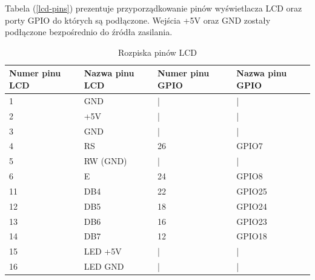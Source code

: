 \documentclass[11pt,a4paper, twoside]{article}
\begin{document}
Tabela (\ref{lcd-pins}) prezentuje przyporządkowanie pinów wyświetlacza LCD oraz porty GPIO do których są podłączone. Wejścia +5V oraz GND zostały podłączone bezpośrednio do źródła zasilania.
\begin{table}[H]
\begin{center}
\begin{tabular}{ | l | l | l | l | }
\hline
Numer pinu LCD & Nazwa pinu LCD & Numer pinu GPIO & Nazwa pinu GPIO \\ \hline
1 & GND & | &  | \\ \hline
2 & +5V & | &  | \\ \hline
3 & GND & | &  | \\ \hline
4 & RS &  26 & GPIO7 \\ \hline
5 & RW (GND) & | & | \\ \hline 
6 & E & 24 & GPIO8 \\ \hline
11 & DB4 & 22 & GPIO25 \\ \hline
12 & DB5 & 18 & GPIO24 \\ \hline
13 & DB6 & 16 & GPIO23 \\ \hline
14 & DB7 & 12 & GPIO18 \\ \hline
15 & LED +5V & | & | \\ \hline
16 & LED GND & | & | \\ \hline
\end{tabular}
\end{center}
\caption{Rozpiska pinów LCD}
$\label{lcd-pins}$
\end{table}
\end{document}
